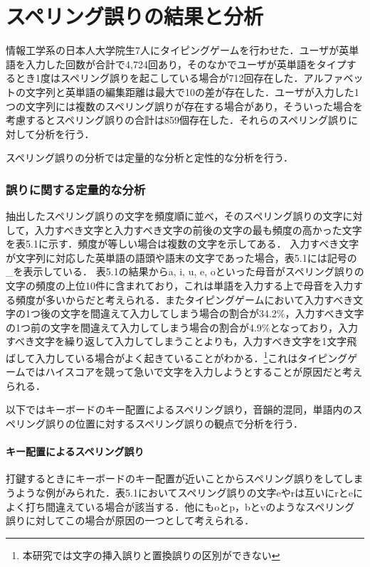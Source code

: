 \chapter{スペリング誤りの結果と分析}
情報工学系の日本人大学院生7人にタイピングゲームを行わせた．ユーザが英単語を入力した回数が合計で4,724回あり，そのなかでユーザが英単語をタイプするとき1度はスペリング誤りを起こしている場合が712回存在した．アルファベットの文字列と英単語の編集距離は最大で10の差が存在した．ユーザが入力した1つの文字列には複数のスペリング誤りが存在する場合があり，そういった場合を考慮するとスペリング誤りの合計は859個存在した．それらのスペリング誤りに対して分析を行う．

スペリング誤りの分析では定量的な分析と定性的な分析を行う．

\subsection{誤りに関する定量的な分析}
抽出したスペリング誤りの文字を頻度順に並べ，そのスペリング誤りの文字に対して，入力すべき文字と入力すべき文字の前後の文字の最も頻度の高かった文字を表5.1に示す．頻度が等しい場合は複数の文字を示してある．
入力すべき文字が文字列に対応した英単語の語頭や語末の文字であった場合，表5.1には記号の\_を表示している．
表5.1の結果からa, i, u, e, oといった母音がスペリング誤りの文字の頻度の上位10件に含まれており，これは単語を入力する上で母音を入力する頻度が多いからだと考えられる．またタイピングゲームにおいて入力すべき文字の1つ後の文字を間違えて入力してしまう場合の割合が34.2\%，入力すべき文字の1つ前の文字を間違えて入力してしまう場合の割合が4.9\%となっており，入力すべき文字を繰り返して入力してしまうことよりも，入力すべき文字を1文字飛ばして入力している場合がよく起きていることがわかる．\footnote{本研究では文字の挿入誤りと置換誤りの区別ができない}これはタイピングゲームではハイスコアを競って急いで文字を入力しようとすることが原因だと考えられる．

以下ではキーボードのキー配置によるスペリング誤り，音韻的混同，単語内のスペリング誤りの位置に対するスペリング誤りの観点で分析を行う．

\subsubsection{キー配置によるスペリング誤り}
打鍵するときにキーボードのキー配置が近いことからスペリング誤りをしてしまうような例がみられた．表5.1においてスペリング誤りの文字eやrは互いにrとeによく打ち間違えている場合が該当する．他にもoとp，bとvのようなスペリング誤りに対してこの場合が原因の一つとして考えられる．

